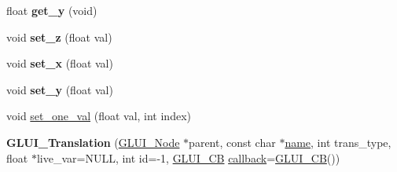 \begin{DoxyCompactItemize}
\item 
\hypertarget{class_g_l_u_i___translation_aa2863477d762d4a29a7b19ef3454a3bb}{float {\bfseries get\+\_\+y} (void)}\label{class_g_l_u_i___translation_aa2863477d762d4a29a7b19ef3454a3bb}

\item 
\hypertarget{class_g_l_u_i___translation_aa82c90797ca5cd0f6a79233693398e15}{void {\bfseries set\+\_\+z} (float val)}\label{class_g_l_u_i___translation_aa82c90797ca5cd0f6a79233693398e15}

\item 
\hypertarget{class_g_l_u_i___translation_acf59403020d9552c9be4afe774ad59a4}{void {\bfseries set\+\_\+x} (float val)}\label{class_g_l_u_i___translation_acf59403020d9552c9be4afe774ad59a4}

\item 
\hypertarget{class_g_l_u_i___translation_ae6eed14a15be75c89bdd91b1cd9c3ead}{void {\bfseries set\+\_\+y} (float val)}\label{class_g_l_u_i___translation_ae6eed14a15be75c89bdd91b1cd9c3ead}

\item 
void \hyperlink{class_g_l_u_i___translation_a8da9c19319e63bccbbe1b3c4b7cc1982}{set\+\_\+one\+\_\+val} (float val, int index)
\item 
\hypertarget{class_g_l_u_i___translation_a078dd021e5c4870e901d459d6dd0ec9a}{{\bfseries G\+L\+U\+I\+\_\+\+Translation} (\hyperlink{class_g_l_u_i___node}{G\+L\+U\+I\+\_\+\+Node} $\ast$parent, const char $\ast$\hyperlink{class_g_l_u_i___control_aa95b97d50df45335fc33f0af03958eb3}{name}, int trans\+\_\+type, float $\ast$live\+\_\+var=N\+U\+L\+L, int id=-\/1, \hyperlink{class_g_l_u_i___c_b}{G\+L\+U\+I\+\_\+\+C\+B} \hyperlink{class_g_l_u_i___control_a96060fe0cc6d537e736dd6eef78e24ab}{callback}=\hyperlink{class_g_l_u_i___c_b}{G\+L\+U\+I\+\_\+\+C\+B}())}\label{class_g_l_u_i___translation_a078dd021e5c4870e901d459d6dd0ec9a}

\end{DoxyCompactItemize}
